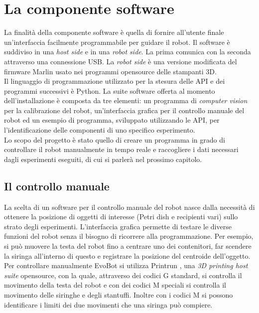 \section{La componente software}
\label{sec:123}
La finalità della componente software è quella di fornire all'utente finale un'interfaccia facilmente programmabile per guidare il robot. Il software è suddiviso in una \emph{host side} e in una \emph{robot side}. La prima comunica con la seconda attraverso una connessione USB. La \emph{robot side} è una versione modificata del firmware Marlin usato nei programmi opensource delle stampanti 3D. 
\\Il linguaggio di programmazione utilizzato per la stesura delle API e dei programmi successivi è Python. La suite software offerta al momento dell'installazione è composta da tre elementi:
un programma di \emph{computer vision} per la calibrazione del robot, un'interfaccia grafica per il controllo manuale del robot ed un esempio di programma, sviluppato utilizzando le API, per l'identificazione delle componenti di uno specifico esperimento.
\\Lo scopo del progetto è stato quello di creare un programma in grado di controllare il robot manualmente in tempo reale e raccogliere i dati necessari dagli esperimenti eseguiti, di cui si parlerà nel prossimo capitolo. 

\subsection{Il controllo manuale}
\label{sec:00123}
La scelta di un software per il controllo manuale del robot nasce dalla necessità di ottenere la posizione di oggetti di interesse (Petri dish e recipienti vari) sullo strato degli esperimenti. L'interfaccia grafica permette di testare le diverse funzioni del robot senza il bisogno di ricorrere alla programmazione. Per esempio, si può muovere la testa del robot fino a centrare uno dei contenitori, far scendere la siringa all'interno di questo e registrare la posizione del centroide dell'oggetto. 
\\Per controllare manualmente EvoBot si utilizza Printrun \cite{printrun}, una \emph{3D printing host suite}  opensource, con la quale, attraverso dei codici G standard, si controlla il movimento della testa del robot e con dei codici M speciali si controlla il movimento delle siringhe e degli stantuffi. Inoltre con i codici M si possono identificare i limiti dei due movimenti che una siringa può compiere.

